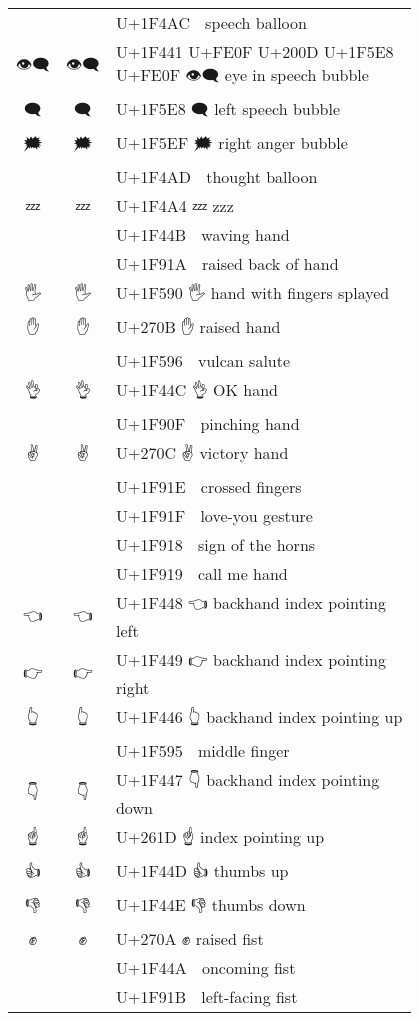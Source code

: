 \documentclass[a4paper,12pt]{ltjarticle}
\newcommand{\fontA}[1]{{\fontspec[RawFeature={mode=harf,dist,ccmp}]{Segoe UI Emoji} #1}}
\newcommand{\fontB}[1]{{\fontspec[RawFeature={mode=harf,dist,ccmp}]{Noto Color Emoji} #1}}
\begin{document}
\begin{longtable}[c]{ccp{0.8\linewidth}}
\fontA{💬}&\fontB{💬}&U+1F4AC 💬 speech balloon\\
\fontA{👁️‍🗨️}&\fontB{👁️‍🗨️}&U+1F441 U+FE0F U+200D U+1F5E8 U+FE0F 👁️‍🗨️ eye in speech bubble\\
\fontA{🗨}&\fontB{🗨}&U+1F5E8 🗨 left speech bubble\\
\fontA{🗯}&\fontB{🗯}&U+1F5EF 🗯 right anger bubble\\
\fontA{💭}&\fontB{💭}&U+1F4AD 💭 thought balloon\\
\fontA{💤}&\fontB{💤}&U+1F4A4 💤 zzz\\
\fontA{👋}&\fontB{👋}&U+1F44B 👋 waving hand\\
\fontA{🤚}&\fontB{🤚}&U+1F91A 🤚 raised back of hand\\
\fontA{🖐}&\fontB{🖐}&U+1F590 🖐 hand with fingers splayed\\
\fontA{✋}&\fontB{✋}&U+270B ✋ raised hand\\
\fontA{🖖}&\fontB{🖖}&U+1F596 🖖 vulcan salute\\
\fontA{👌}&\fontB{👌}&U+1F44C 👌 OK hand\\
\fontA{🤏}&\fontB{🤏}&U+1F90F 🤏 pinching hand\\
\fontA{✌}&\fontB{✌}&U+270C ✌ victory hand\\
\fontA{🤞}&\fontB{🤞}&U+1F91E 🤞 crossed fingers\\
\fontA{🤟}&\fontB{🤟}&U+1F91F 🤟 love-you gesture\\
\fontA{🤘}&\fontB{🤘}&U+1F918 🤘 sign of the horns\\
\fontA{🤙}&\fontB{🤙}&U+1F919 🤙 call me hand\\
\fontA{👈}&\fontB{👈}&U+1F448 👈 backhand index pointing left\\
\fontA{👉}&\fontB{👉}&U+1F449 👉 backhand index pointing right\\
\fontA{👆}&\fontB{👆}&U+1F446 👆 backhand index pointing up\\
\fontA{🖕}&\fontB{🖕}&U+1F595 🖕 middle finger\\
\fontA{👇}&\fontB{👇}&U+1F447 👇 backhand index pointing down\\
\fontA{☝}&\fontB{☝}&U+261D ☝ index pointing up\\
\fontA{👍}&\fontB{👍}&U+1F44D 👍 thumbs up\\
\fontA{👎}&\fontB{👎}&U+1F44E 👎 thumbs down\\
\fontA{✊}&\fontB{✊}&U+270A ✊ raised fist\\
\fontA{👊}&\fontB{👊}&U+1F44A 👊 oncoming fist\\
\fontA{🤛}&\fontB{🤛}&U+1F91B 🤛 left-facing fist\\

\end{longtable}
\end{document}
